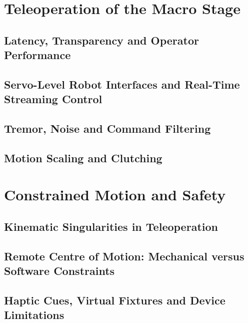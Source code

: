 \section{Teleoperation of the Macro Stage}
\label{sec:lit-teleop}

\subsection{Latency, Transparency and Operator Performance}
\label{sec:lit-latency}

\subsection{Servo-Level Robot Interfaces and Real-Time Streaming Control}
\label{sec:lit-servo-interfaces}

\subsection{Tremor, Noise and Command Filtering}
\label{sec:lit-filtering}

\subsection{Motion Scaling and Clutching}
\label{sec:lit-scaling}

\section{Constrained Motion and Safety}
\label{sec:lit-safety}

\subsection{Kinematic Singularities in Teleoperation}
\label{sec:lit-singularities}

\subsection{Remote Centre of Motion: Mechanical versus Software Constraints}
\label{sec:lit-rcm}

\subsection{Haptic Cues, Virtual Fixtures and Device Limitations}
\label{sec:lit-haptics}

